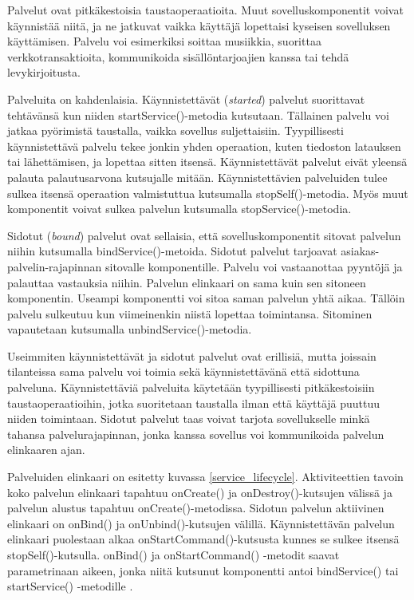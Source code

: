Palvelut ovat pitkäkestoisia taustaoperaatioita. Muut sovelluskomponentit voivat käynnistää niitä, ja ne jatkuvat vaikka käyttäjä lopettaisi kyseisen sovelluksen käyttämisen. Palvelu voi esimerkiksi soittaa musiikkia, suorittaa verkkotransaktioita, kommunikoida sisällöntarjoajien kanssa tai tehdä levykirjoitusta.

Palveluita on kahdenlaisia. Käynnistettävät (\emph{started}) palvelut suorittavat tehtävänsä kun niiden startService()-metodia kutsutaan. Tällainen palvelu voi jatkaa pyörimistä taustalla, vaikka sovellus suljettaisiin. Tyypillisesti käynnistettävä palvelu tekee jonkin yhden operaation, kuten tiedoston latauksen tai lähettämisen, ja lopettaa sitten itsensä. Käynnistettävät palvelut eivät yleensä palauta palautusarvona kutsujalle mitään. Käynnistettävien palveluiden tulee sulkea itsensä operaation valmistuttua kutsumalla stopSelf()-metodia. Myös muut komponentit voivat sulkea palvelun kutsumalla stopService()-metodia.

Sidotut (\emph{bound}) palvelut ovat sellaisia, että sovelluskomponentit sitovat palvelun niihin kutsumalla bindService()-metoida. Sidotut palvelut tarjoavat asiakas-palvelin-rajapinnan sitovalle komponentille. Palvelu voi vastaanottaa pyyntöjä ja palauttaa vastauksia niihin. Palvelun elinkaari on sama kuin sen sitoneen komponentin. Useampi komponentti voi sitoa saman palvelun yhtä aikaa. Tällöin palvelu sulkeutuu kun viimeinenkin niistä lopettaa toimintansa. Sitominen vapautetaan kutsumalla unbindService()-metodia.

Useimmiten käynnistettävät ja sidotut palvelut ovat erillisiä, mutta joissain tilanteissa sama palvelu voi toimia sekä käynnistettävänä että sidottuna palveluna. Käynnistettäviä palveluita käytetään tyypillisesti pitkäkestoisiin taustaoperaatioihin, jotka suoritetaan taustalla ilman että käyttäjä puuttuu niiden toimintaan. Sidotut palvelut taas voivat tarjota sovellukselle minkä tahansa palvelurajapinnan, jonka kanssa sovellus voi kommunikoida palvelun elinkaaren ajan.

Palveluiden elinkaari on esitetty kuvassa \ref{service_lifecycle}. Aktiviteettien tavoin koko palvelun elinkaari tapahtuu onCreate() ja onDestroy()-kutsujen välissä ja palvelun alustus tapahtuu onCreate()-metodissa. Sidotun palvelun aktiivinen elinkaari on onBind() ja onUnbind()-kutsujen välillä. Käynnistettävän palvelun elinkaari puolestaan alkaa onStartCommand()-kutsusta kunnes se sulkee itsensä stopSelf()-kutsulla. onBind() ja onStartCommand() -metodit saavat parametrinaan aikeen, jonka niitä kutsunut komponentti antoi bindService() tai startService() -metodille \cite{android}.

